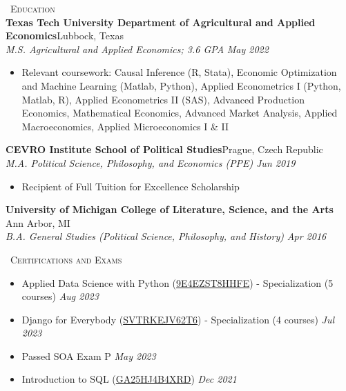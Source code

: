 \documentclass[a4paper,11pt]{article}
\newcommand{\header} [1] {
    \vspace{1mm}
    {\textsc{\large{\xrfill[0.5ex]{0.5pt}~#1~\xrfill[0.5ex]{0.5pt}}}} %
}
\begin{document}

\header{Education} \\
\vspace{1mm}
\textbf{Texas Tech University Department of Agricultural and Applied Economics}\hfill Lubbock, Texas\\
\textit{M.S. Agricultural and Applied Economics; 3.6 GPA} \hfill  \emph{May 2022} \\
\begin{itemize}
    \item Relevant coursework: Causal Inference (R, Stata), Economic Optimization and Machine Learning (Matlab, Python), Applied Econometrics I (Python, Matlab, R), Applied Econometrics II (SAS), Advanced Production Economics, Mathematical Economics, Advanced Market Analysis, Applied Macroeconomics, Applied Microeconomics I \& II
\end{itemize}
\vspace{1mm}

\textbf{CEVRO Institute School of Political Studies}\hfill Prague, Czech Republic\\
\textit{M.A. Political Science, Philosophy, and Economics (PPE)} \hfill  \emph{Jun 2019}\\
\begin{itemize}
    \item Recipient of Full Tuition for Excellence Scholarship
\end{itemize}
\vspace{1mm}

\textbf{University of Michigan College of Literature, Science, and the Arts} \hfill Ann Arbor, MI\\
\textit{B.A. General Studies (Political Science, Philosophy, and History)} \hfill  \emph{Apr 2016}\\

\vspace{1mm}

\header{Certifications and Exams} \\
\vspace{1mm}
\begin{itemize}
    \item Applied Data Science with Python (\href{https://www.coursera.org/account/accomplishments/specialization/9E4EZST8HHFE}{9E4EZST8HHFE}) - Specialization (5 courses) \hfill \emph{Aug 2023}
    \item Django for Everybody (\href{https://www.coursera.org/account/accomplishments/specialization/SVTRKEJV62T6}{SVTRKEJV62T6}) - Specialization (4 courses) \hfill \emph{Jul 2023}
    \item Passed SOA Exam P \hfill \emph{May 2023}
    \item Introduction to SQL (\href{https://www.coursera.org/account/accomplishments/verify/GA25HJ4B4XRD}{GA25HJ4B4XRD}) \hfill  \emph{Dec 2021}
\end{itemize}
\vspace{1mm}
\end{document}
